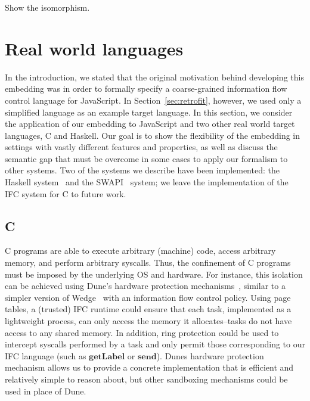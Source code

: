 \documentclass{sigplanconf}
\newcommand{\Red}[1]{{\color{red} #1}}
\begin{document}
\Red{Show the isomorphism.}



\section{Real world languages}
\label{sec:real}

In the introduction, we stated that the original motivation behind
developing this embedding was in order to formally specify a
coarse-grained information flow control language for JavaScript.
%
In Section~\ref{sec:retrofit}, however, we used only a simplified
language as an example target language.
%
In this section, we consider the application of our embedding to
JavaScript and two other real world target languages, C and Haskell.
%
Our goal is to show the flexibility of the embedding in settings with
vastly different features and properties, as well as discuss the
semantic gap that must be overcome in some cases to apply our formalism
to other systems.
%
Two of the systems we describe have been implemented: the Haskell
system~\cite{lio} and the SWAPI~\cite{swapi} system; we leave the
implementation of the IFC system for C to future work.

\subsection{C}
\label{sec:real:c}
%
C programs are able to execute arbitrary (machine) code, access
arbitrary memory, and perform arbitrary syscalls.
%
Thus, the confinement of C programs must be imposed by the underlying OS
and hardware.
%
For instance, this isolation can be achieved using Dune's hardware protection
mechanisms~\cite{Belay:2012:DSU:2387880.2387913}, similar to a simpler
version of Wedge~\cite{Belay:2012:DSU:2387880.2387913,
Bittau:2008:WSA:1387589.1387611} with an information flow control
policy.
%
Using page tables, a (trusted) IFC runtime could ensure that each task,
implemented as a lightweight process, can only access the memory it
allocates--tasks do not have access to any shared memory.
%
In addition, ring protection could be used to intercept syscalls performed by
a task and only permit those corresponding to our IFC language (such as
\ensuremath{\mathbf{getLabel}} or \ensuremath{\mathbf{send}}).
%
Dunes hardware protection mechanism allows us to provide a concrete
implementation that is efficient and relatively simple to reason
about, but other sandboxing mechanisms could be used in place of Dune.
\end{document}
